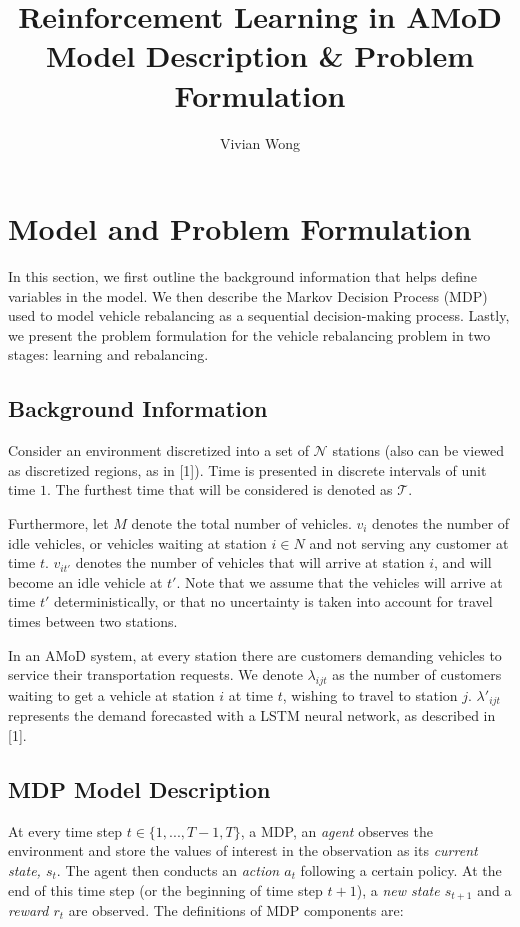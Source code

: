 \documentclass[letterpaper, 10 pt, conference]{ieeeconf}  %
\title{\LARGE \bf Reinforcement Learning in AMoD\\
Model Description \& Problem Formulation
}
\author{Vivian Wong}
\begin{document}
\maketitle
\thispagestyle{empty}
\pagestyle{empty}


\section{Model and Problem Formulation}
In this section, we first outline the background information that helps define variables in the model. We then describe the Markov Decision Process (MDP) used to model vehicle rebalancing as a sequential decision-making process. Lastly, we present the problem formulation for the vehicle rebalancing problem in two stages: learning and rebalancing. 

\subsection{Background Information}
Consider an environment discretized into a set of $\mathcal{N}$ stations (also can be viewed as discretized regions, as in [1]). Time is presented in discrete intervals of unit time $1$. The furthest time that will be considered is denoted as $\mathcal{T}$.

Furthermore, let $M$ denote the total number of vehicles. $v_i$ denotes the number of idle vehicles, or vehicles waiting at station $i\in N$ and not serving any customer at time $t$. $v_{it'}$ denotes the number of vehicles that will arrive at station $i$, and will become an idle vehicle at $t'$. Note that we assume that the vehicles will arrive at time $t'$ deterministically, or that no uncertainty is taken into account for travel times between two stations. 

In an AMoD system, at every station there are customers demanding vehicles to service their transportation requests. We denote $\lambda_{ijt}$ as the number of customers waiting to get a vehicle at station $i$ at time $t$, wishing to travel to station $j$. $\lambda'_{ijt}$ represents the demand forecasted with a LSTM neural network, as described in [1].
\subsection{MDP Model Description}
At every time step $t \in \{1,...,T-1,T\}$, a MDP, an \textit{agent} observes the environment and store the values of interest in the observation as its \textit{current state, $s_t$}. The agent then conducts an \textit{action $a_t$} following a certain policy. At the end of this time step (or the beginning of time step $t+1$), a \textit{new state $s_{t+1}$} and a \textit{reward $r_t$} are observed. The definitions of MDP components are:\\
\end{document}
